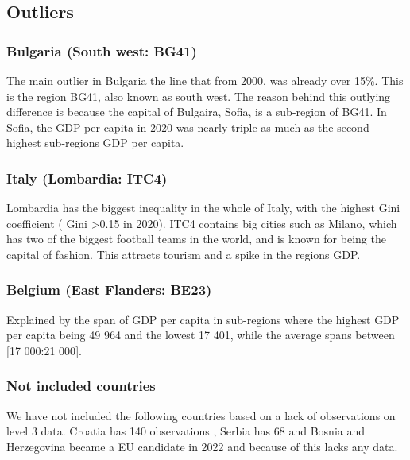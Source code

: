 \documentclass[
  letterpaper,
  DIV=11,
  numbers=noendperiod]{scrartcl}
\begin{document}
\hypertarget{outliers}{%
\subsection{Outliers}\label{outliers}}

\hypertarget{bulgaria-south-west-bg41}{%
\subsubsection{Bulgaria (South west:
BG41)}\label{bulgaria-south-west-bg41}}

The main outlier in Bulgaria the line that from 2000, was already over
15\%. This is the region BG41, also known as south west. The reason
behind this outlying difference is because the capital of Bulgaira,
Sofia, is a sub-region of BG41. In Sofia, the GDP per capita in 2020 was
nearly triple as much as the second highest sub-regions GDP per capita.

\hypertarget{italy-lombardia-itc4}{%
\subsubsection{Italy (Lombardia: ITC4)}\label{italy-lombardia-itc4}}

Lombardia has the biggest inequality in the whole of Italy, with the
highest Gini coefficient ( Gini \textgreater0.15 in 2020). ITC4 contains
big cities such as Milano, which has two of the biggest football teams
in the world, and is known for being the capital of fashion. This
attracts tourism and a spike in the regions GDP.

\hypertarget{belgium-east-flanders-be23}{%
\subsubsection{Belgium (East Flanders:
BE23)}\label{belgium-east-flanders-be23}}

Explained by the span of GDP per capita in sub-regions where the highest
GDP per capita being 49 964 and the lowest 17 401, while the average
spans between {[}17 000:21 000{]}.

\hypertarget{not-included-countries}{%
\subsubsection{Not included countries}\label{not-included-countries}}

We have not included the following countries based on a lack of
observations on level 3 data. Croatia has 140 observations , Serbia has
68 and Bosnia and Herzegovina became a EU candidate in 2022 and because
of this lacks any data.
\end{document}
